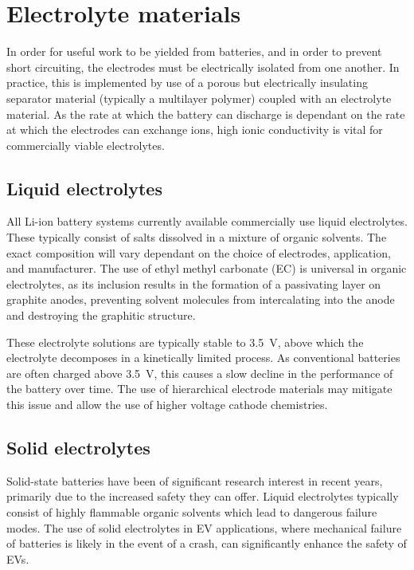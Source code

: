 \newpage
\section{Electrolyte materials}
In order for useful work to be yielded from batteries, and in order to prevent short circuiting, the electrodes must be electrically isolated from one another.\cite{Palacin2009}
In practice, this is implemented by use of a porous but electrically insulating separator material (typically a multilayer polymer) coupled with an electrolyte material.
As the rate at which the battery can discharge is dependant on the rate at which the electrodes can exchange  ions, high ionic conductivity is vital for commercially viable electrolytes.


\subsection{Liquid electrolytes}
All Li-ion battery systems currently available commercially use liquid electrolytes.\cite{Famprikis2019}
These typically consist of  salts dissolved in a mixture of organic solvents.
The exact composition will vary dependant on the choice of electrodes, application, and manufacturer.
The use of ethyl methyl carbonate (EC) is universal in organic electrolytes, as its inclusion results in the formation of a passivating layer on graphite anodes, preventing solvent molecules from intercalating into the anode and destroying the graphitic structure.\cite{Palacin2009}

These electrolyte solutions are typically stable to \SI{3.5}{\volt}, above which the electrolyte decomposes in a kinetically limited process.
As conventional batteries are often charged above \SI{3.5}{\volt}, this causes a slow decline in the performance of the battery over time.
The use of hierarchical electrode materials may mitigate this issue and allow the use of higher voltage cathode chemistries. \cite{Zhou2018}

\subsection{Solid electrolytes}
Solid-state batteries have been of significant research interest in recent years, primarily due to the increased safety they can offer.\cite{Famprikis2019, Zhang2018, Manthiram2017a, Janek2016}
Liquid electrolytes typically consist of highly flammable organic solvents which lead to dangerous failure modes.
The use of solid electrolytes in EV applications, where mechanical failure of batteries is likely in the event of a crash, can significantly enhance the safety of EVs.

